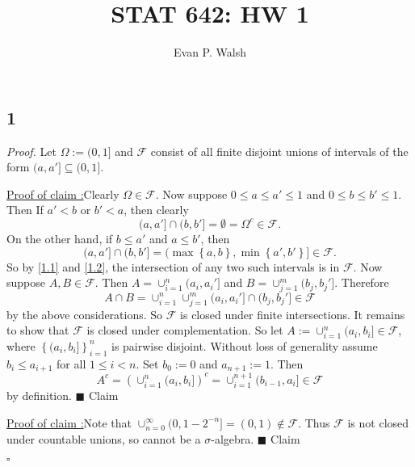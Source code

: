 \documentclass[12pt]{article}
\title{STAT 642: HW 1}
\author{Evan P. Walsh}
\newcounter{ProofCounter}
\newcounter{ClaimCounter}[ProofCounter]
\newenvironment{Proof}{\stepcounter{ProofCounter}\textit{Proof.}}{\hfill$\square$}
\newenvironment{claim}[1]{\vspace{1mm}\stepcounter{ClaimCounter}\par\noindent\underline{\bf Claim \theClaimCounter:}\space#1}{}
\newenvironment{claimproof}[1]{\par\noindent\underline{Proof of claim \theClaimCounter:}\space#1}{\hfill $\blacksquare$ Claim \theClaimCounter}
\begin{document}
\maketitle

\subsection*{1}

\begin{Proof} Let $\Omega := (0,1]$ and $\mathcal{F}$ consist of all finite disjoint unions of intervals of the form $(a,a'] \subseteq (0,1]$.

\begin{claimproof}
Clearly $\Omega \in \mathcal{F}$. Now suppose $0 \leq a \leq a' \leq 1$ and $0 \leq b \leq b' \leq 1$. Then 
If $a' < b$ or $b' < a$, then clearly 
\begin{equation}
(a,a'] \cap (b,b'] = \emptyset = \Omega^{c} \in \mathcal{F}.
\label{1.1}
\end{equation}
On the other hand, if $b \leq a'$ and $a \leq b'$, then 
\begin{equation}
(a,a'] \cap (b,b'] = (\max\left\{ a,b \right\}, \min\left\{ a',b' \right\}] \in \mathcal{F}.
\label{1.2}
\end{equation}
So by \eqref{1.1} and \eqref{1.2}, the intersection of any two such intervals is in $\mathcal{F}$. Now suppose $A, B \in \mathcal{F}$. Then $A =
\cup_{i=1}^{n}(a_{i}, a_{i}']$ and $B = \cup_{j=1}^{m}(b_{j},b_{j}']$. Therefore 
\[ A\cap B = \cup_{i=1}^{n}\cup_{j=1}^{m}(a_{i},a_{i}']\cap (b_{j},b_{j}'] \in \mathcal{F} \]
by the above considerations. So $\mathcal{F}$ is closed under finite intersections. It remains to show that $\mathcal{F}$ is closed under
complementation. So let $A := \cup_{i=1}^{n}(a_{i},b_{i}] \in \mathcal{F}$, where $\left\{ (a_{i},b_{i}] \right\}_{i=1}^{n}$ is pairwise disjoint.
Without loss of generality assume $b_{i} \leq a_{i+1}$ for all $1\leq i < n$. Set $b_{0} := 0$ and $a_{n+1} := 1$. Then 
\[ A^{c} = \left( \cup_{i=1}^{n}(a_{i},b_{i}] \right)^{c} = \cup_{i=1}^{n+1}(b_{i-1},a_{i}] \in \mathcal{F} \]
by definition.
\end{claimproof}

\begin{claimproof}
Note that $\cup_{n=0}^{\infty}(0,1-2^{-n}] = (0,1) \notin \mathcal{F}$. Thus $\mathcal{F}$ is not closed under countable unions, so cannot be a $\sigma$-algebra.
\end{claimproof}

\end{Proof}
\end{document}
